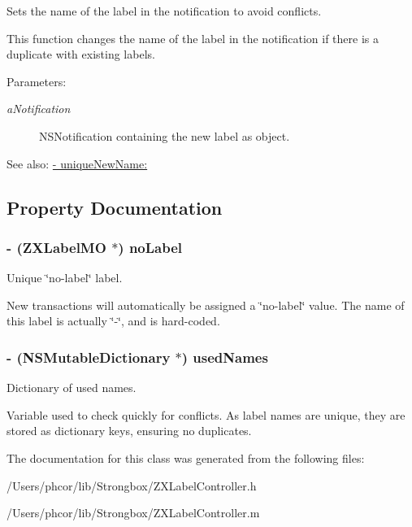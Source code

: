 Sets the name of the label in the notification to avoid conflicts. 

This function changes the name of the label in the notification if there is a duplicate with existing labels. \begin{Desc}
\item[Parameters:]
\begin{description}
\item[{\em aNotification}]NSNotification containing the new label as object. \end{description}
\end{Desc}
\begin{Desc}
\item[See also:]\hyperlink{interface_z_x_label_controller_e223bf8f8bc63f53f0790b34050fee97}{- uniqueNewName:} \end{Desc}


\subsection{Property Documentation}
\hypertarget{interface_z_x_label_controller_f14ea66b07ab427e79c1f0a7772288fd}{
\subsubsection[{noLabel}]{\setlength{\rightskip}{0pt plus 5cm}- ({\bf ZXLabelMO} $\ast$) noLabel}}
\label{interface_z_x_label_controller_f14ea66b07ab427e79c1f0a7772288fd}


Unique \char`\"{}no-label\char`\"{} label. 

New transactions will automatically be assigned a \char`\"{}no-label\char`\"{} value. The name of this label is actually \char`\"{}-\char`\"{}, and is hard-coded. \hypertarget{interface_z_x_label_controller_3ccce02a168774242989b7c30294660e}{
\subsubsection[{usedNames}]{\setlength{\rightskip}{0pt plus 5cm}- (NSMutableDictionary $\ast$) usedNames}}
\label{interface_z_x_label_controller_3ccce02a168774242989b7c30294660e}


Dictionary of used names. 

Variable used to check quickly for conflicts. As label names are unique, they are stored as dictionary keys, ensuring no duplicates. 

The documentation for this class was generated from the following files:\begin{CompactItemize}
\item 
/Users/phcor/lib/Strongbox/ZXLabelController.h\item 
/Users/phcor/lib/Strongbox/ZXLabelController.m\end{CompactItemize}
